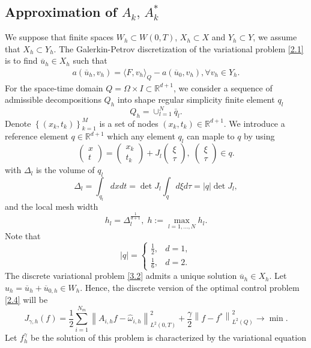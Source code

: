 \documentclass[]{article}
\begin{document}
\subsection{Approximation of $A_k,\, A_k^*$}
We suppose that finite spaces $W_h\subset W(0, T)$, $X_h \subset X$ and $Y_h \subset Y$, we assume that $X_h \subset Y_h$. 
The Galerkin-Petrov discretization of the variational problem \eqref{2.1} is to find $\overline{u}_h\in X_h$ such that
\begin{align}\label{3.2}
	a(\overline{u}_h, v_h)=\langle F, v_h\rangle_Q-a(\overline{u}_0, v_h), \forall v_h\in Y_h.
\end{align}
For the space-time domain $Q=\Omega\times I\subset \mathbb{R}^{d+1}$, we consider a sequence of admissible decompositions $Q_h$ into shape regular simplicity finite element $q_l$
$$Q_h=\cup_{l=1}^{N}\bar{q}_l.$$
Denote $\left\lbrace (x_k, t_k)\right\rbrace_{k=1}^M $ is a set of nodes $(x_k, t_k)\in \mathbb{R}^{d+1}$. We introduce a reference element $q\in \mathbb{R}^{d+1}$ which any element $q_l$ can maple to $q$ by using
$$\begin{pmatrix}x\\t\end{pmatrix}=\begin{pmatrix}x_k\\t_k\end{pmatrix}+J_l\begin{pmatrix}\xi\\\tau\end{pmatrix}, \; \begin{pmatrix}\xi\\\tau\end{pmatrix}\in q.$$
with $\Delta_l$ is the volume of $q_l$ 
$$\Delta_l=\int_{q_l}dxdt=\det J_l\int_q d\xi d\tau=|q|\det J_l,$$
and the local mesh width
$$h_l=\Delta_l^{\frac{1}{d+1}},\; h:=\max_{l=1, ..., N}h_l.$$
Note that
$$|q|=\begin{cases}
	\frac{1}{2},& d=1,\\[0.1cm]
	\frac{1}{6},& d=2.
\end{cases}$$
The discrete variational problem \eqref{3.2} admits a unique solution $\overline{u}_h\in X_h$. Let $u_h=\overline{u}_h+\overline{u}_{0,h}\in W_h$. Hence, the discrete version of the optimal control problem \eqref{2.4} will be
$$J_{\gamma, h}(f)=\frac{1}{2}\sum_{i=1}^{N_m}\left\|A_{i, h}f-\hat{\omega}_{i, h}\right\|^2_{L^2(0, T)}+\frac{\gamma}{2}\left\|f-f^*\right\|^2_{L^2(Q)}\to \min.$$
Let $f^\gamma_h$ be the solution of this problem is characterized by the variational equation
\end{document}

